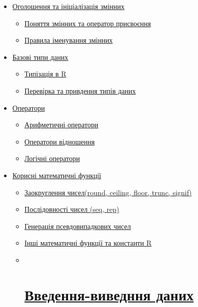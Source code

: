 \documentclass[
]{book}
\providecommand{\tightlist}{%
  \setlength{\itemsep}{0pt}\setlength{\parskip}{0pt}}
\begin{document}
\begin{itemize}
\tightlist
\item
  \protect\hyperlink{chapter21}{Оголошення та ініціалізація змінних}

  \begin{itemize}
  \tightlist
  \item
    \protect\hyperlink{chapter211}{Поняття змінних та оператор присвоєння}
  \item
    \protect\hyperlink{chapter212}{Правила іменування змінних}
  \end{itemize}
\item
  \protect\hyperlink{chapter22}{Базові типи даних}

  \begin{itemize}
  \tightlist
  \item
    \protect\hyperlink{chapter221}{Типізація в R}
  \item
    \protect\hyperlink{chapter222}{Перевірка та привдення типів даних}
  \end{itemize}
\item
  \protect\hyperlink{chapter23}{Оператори}

  \begin{itemize}
  \tightlist
  \item
    \protect\hyperlink{chapter231}{Арифметичні оператори}
  \item
    \protect\hyperlink{chapter232}{Оператори відношення}
  \item
    \protect\hyperlink{chapter233}{Логічні оператори}
  \end{itemize}
\item
  \protect\hyperlink{chapter24}{Корисні математичні функції}

  \begin{itemize}
  \item
    \protect\hyperlink{chapter241}{Заокруглення чисел(round, ceiling, floor, trunc, signif)}
  \item
    \protect\hyperlink{chapter242}{Послідовності чисел (seq, rep)}
  \item
    \protect\hyperlink{chapter243}{Генерація псевдовипадкових чисел}
  \item
    \protect\hyperlink{chapter244}{Інші математичні функції та константи R}
  \item ~
    \hypertarget{ux432ux432ux435ux434ux435ux43dux43dux44f-ux432ux438ux432ux435ux434ux43dux43dux44f-ux434ux430ux43dux438ux445}{%
    \section{\texorpdfstring{\protect\hyperlink{chapter245}{Введення-виведння даних}}{Введення-виведння даних}}\label{ux432ux432ux435ux434ux435ux43dux43dux44f-ux432ux438ux432ux435ux434ux43dux43dux44f-ux434ux430ux43dux438ux445}}
  \end{itemize}
\end{itemize}
\end{document}
